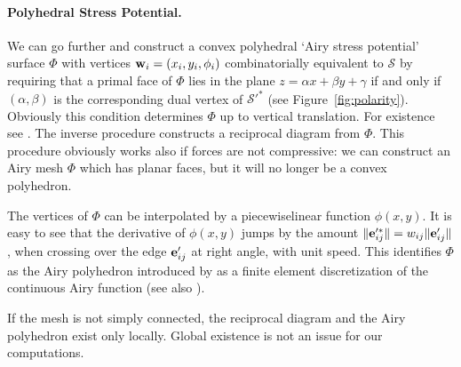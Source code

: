 \documentclass[review]{acmsiggraph}
\def\SS{{\mathcal S}}
\begin{document}
\paragraph{Polyhedral Stress Potential.}

We can go further and construct a convex polyhedral `Airy stress 
potential' surface $\Phi$ with vertices ${\mathbf w}_i=(x_i,y_i,\phi_i)$ 
combinatorially equivalent to $\SS$ by requiring that a primal face of 
$\Phi$ lies in the plane $z=\alpha x + \beta y + \gamma$ if and only if 
$(\alpha,\beta)$ is the corresponding dual vertex of $\SS'^*$ (see 
Figure~\ref{fig:polarity}). Obviously this condition determines $\Phi$ up 
to vertical translation. For existence see \cite{Ash1988}. The inverse 
procedure constructs a reciprocal diagram from $\Phi$. This procedure 
obviously works also if forces are not compressive: we can construct an 
Airy mesh $\Phi$ which has planar faces, but it will no longer be a convex 
polyhedron.

The vertices of $\Phi$ can be interpolated by a piecewise\dash linear 
function $\phi(x,y)$. It is easy to see that the derivative of $\phi(x,y)$ 
jumps by the amount $\|{\mathbf e}_{ij}'^*\| = w_{ij}\|{\mathbf e}_{ij}'\|$, when crossing 
over the edge ${\mathbf e}'_{ij}$ at right angle, with unit speed. This identifies 
$\Phi$ as the Airy polyhedron introduced by \cite{Fraternali2002a} as a 
finite element discretization of the continuous Airy function (see also 
\cite{Fraternali2010}).

If the mesh is not simply connected, the reciprocal diagram and the Airy 
polyhedron exist only locally. Global existence is not an issue for our
computations.
\end{document}
